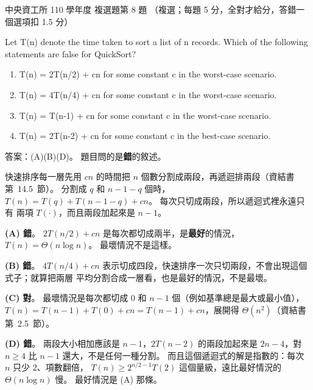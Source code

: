 \begin{pastexam}[label={px:ncu-110-dsa-08}]{中央資工所 110 學年度 複選題第 8 題}
（複選；每題 5 分，全對才給分，答錯一個選項扣 1.5 分）

Let T(n) denote the time taken to sort a list of n records. Which of the following statements are
false for QuickSort?
\begin{enumerate}[label=(\Alph*)]
\item T(n) = 2T(n/2) + cn for some constant c in the worst-case scenario.
\item T(n) = 4T(n/4) + cn for some constant c in the worst-case scenario.
\item T(n) = T(n-1) + cn for some constant c in the worst-case scenario.
\item T(n) = 2T(n-2) + cn for some constant c in the best-case scenario.
\end{enumerate}
\end{pastexam}

\begin{pastsoln}
答案：(A)(B)(D)。 題目問的是\textbf{錯}的敘述。

快速排序每一層先用 $cn$ 的時間把 $n$ 個數分割成兩段，再遞迴排兩段（資結書第~14.5~節）。 分割成
$q$ 和 $n - 1 - q$ 個時，$T(n) = T(q) + T(n - 1 - q) + cn$。 每次只切成兩段，所以遞迴式裡永遠只有
兩項 $T(\cdot)$，而且兩段加起來是 $n - 1$。

\textbf{(A) 錯}。 $2T(n/2) + cn$ 是每次都切成兩半，是\textbf{最好}的情況，$T(n) = \Theta(n \log n)$。
最壞情況不是這樣。

\textbf{(B) 錯}。 $4T(n/4) + cn$ 表示切成四段，快速排序一次只切兩段，不會出現這個式子；就算把兩層
平均分割合成一層看，也是最好的情況，不是最壞。

\textbf{(C) 對}。 最壞情況是每次都切成 $0$ 和 $n - 1$ 個（例如基準總是最大或最小值），
$T(n) = T(n - 1) + T(0) + cn = T(n-1) + cn$，展開得 $\Theta(n^2)$（資結書第~2.5~節）。

\textbf{(D) 錯}。 兩段大小相加應該是 $n - 1$，$2T(n-2)$ 的兩段加起來是 $2n - 4$，對 $n \ge 4$ 比 $n - 1$
還大，不是任何一種分割。 而且這個遞迴式的解是指數的：每次 $n$ 只少 $2$、項數翻倍，
$T(n) \ge 2^{n/2 - 1}T(2)$ 這個量級，遠比最好情況的 $\Theta(n \log n)$ 慢。 最好情況是 (A) 那條。
\end{pastsoln}
